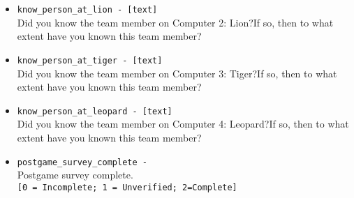 \begin{description}
\begin{addmargin}[0em]{0em}
\begin{addmargin}[1em]{0em}
\begin{itemize}
            \item \verb|know_person_at_lion - [text]|\\Did you know the team member on Computer 2: Lion?If so, then to what extent have you known this team member?
            \item \verb|know_person_at_tiger - [text]|\\Did you know the team member on Computer 3: Tiger?If so, then to what extent have you known this team member?
            \item \verb|know_person_at_leopard - [text]|\\Did you know the team member on Computer 4: Leopard?If so, then to what extent have you known this team member?
            \item \verb|postgame_survey_complete - |\\Postgame survey complete.\\\verb|[0 = Incomplete; 1 = Unverified; 2=Complete]|
        \end{itemize}
    \end{addmargin} %
\end{addmargin} %



\end{description}
